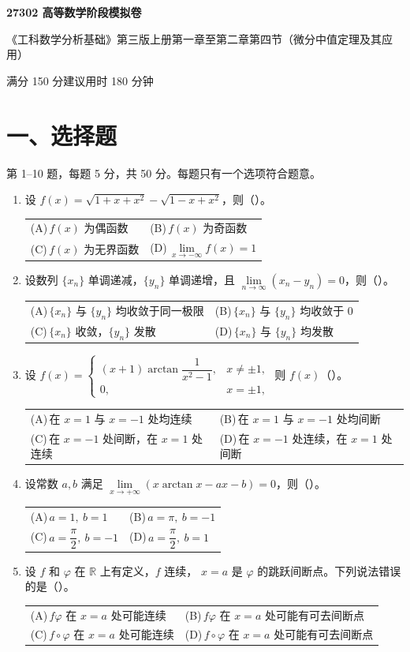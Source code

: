\documentclass[UTF8,a4paper,zihao=-4,fontset=fandol]{ctexart}
\makeatletter
\renewcommand{\lim}{\operatorname*{lim}\limits}
\newcommand{\choices}[4]{%
  \par\vspace{0.15em}
  \begin{tabularx}{\linewidth}{@{}X@{\hspace{1em}}X@{}}
    \textup{(A)}\,#1 & \textup{(B)}\,#2 \\
    \textup{(C)}\,#3 & \textup{(D)}\,#4
  \end{tabularx}\par}
\makeatother
\begin{document}
\begin{center}
  {\LARGE\bfseries 27302 高等数学阶段模拟卷\par}
  \vspace{0.4em}
  {\small 《工科数学分析基础》第三版上册\quad 第一章至第二章第四节（微分中值定理及其应用）\par}
  \vspace{0.4em}
  {\small 满分 150 分\qquad 建议用时 180 分钟}
\end{center}

\section*{一、选择题}
第 1--10 题，每题 5 分，共 50 分。每题只有一个选项符合题意。

\begin{enumerate}[itemsep=0.4em,topsep=0.5em]
  \item 设 $f(x)=\sqrt{1+x+x^2}-\sqrt{1-x+x^2}$，则（\quad）。
  \choices{$f(x)$ 为偶函数}{$f(x)$ 为奇函数}
          {$f(x)$ 为无界函数}{$\displaystyle\lim_{x\to-\infty} f(x)=1$}

  \item 设数列 $\{x_n\}$ 单调递减，$\{y_n\}$ 单调递增，且
  $\displaystyle\lim_{n\to\infty}(x_n-y_n)=0$，则（\quad）。
  \choices{$\{x_n\}$ 与 $\{y_n\}$ 均收敛于同一极限}
          {$\{x_n\}$ 与 $\{y_n\}$ 均收敛于 $0$}
          {$\{x_n\}$ 收敛，$\{y_n\}$ 发散}
          {$\{x_n\}$ 与 $\{y_n\}$ 均发散}

  \item 设 $f(x)=
    \begin{cases}
      (x+1)\arctan\dfrac{1}{x^2-1}, & x\ne\pm1,\\
      0, & x=\pm1,
    \end{cases}$
    则 $f(x)$（\quad）。
  \choices{在 $x=1$ 与 $x=-1$ 处均连续}
          {在 $x=1$ 与 $x=-1$ 处均间断}
          {在 $x=-1$ 处间断，在 $x=1$ 处连续}
          {在 $x=-1$ 处连续，在 $x=1$ 处间断}

  \item 设常数 $a,b$ 满足 $\displaystyle\lim_{x\to+\infty}(x\arctan x-ax-b)=0$，则（\quad）。
  \choices{$a=1,\ b=1$}{$a=\pi,\ b=-1$}
          {$a=\dfrac{\pi}{2},\ b=-1$}{$a=\dfrac{\pi}{2},\ b=1$}

  \item 设 $f$ 和 $\varphi$ 在 $\mathbb{R}$ 上有定义，$f$ 连续，
  $x=a$ 是 $\varphi$ 的跳跃间断点。下列说法错误的是（\quad）。
  \choices{$f\varphi$ 在 $x=a$ 处可能连续}
          {$f\varphi$ 在 $x=a$ 处可能有可去间断点}
          {$f\circ\varphi$ 在 $x=a$ 处可能连续}
          {$f\circ\varphi$ 在 $x=a$ 处可能有可去间断点}


\end{enumerate}
\end{document}
